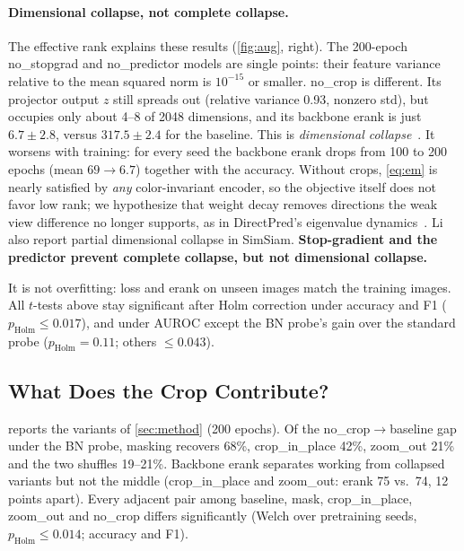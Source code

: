 \documentclass[10pt,twocolumn,letterpaper]{article}
\begin{document}
\paragraph{Dimensional collapse, not complete collapse.}
The effective rank explains these results (\cref{fig:aug}, right).
The 200-epoch no\_stopgrad and no\_predictor models are single points: their feature variance relative to the mean squared norm is $10^{-15}$ or smaller.
no\_crop is different. Its projector output $z$ still spreads out (relative variance 0.93, nonzero std), but occupies only about 4--8 of 2048 dimensions, and its backbone erank is just $6.7\pm2.8$, versus $317.5\pm2.4$ for the baseline.
This is \emph{dimensional collapse}~\cite{jing2022dimensional}.
It worsens with training: for every seed the backbone erank drops from 100 to 200 epochs (mean $69\rightarrow6.7$) together with the accuracy.
Without crops, \cref{eq:em} is nearly satisfied by \emph{any} color-invariant encoder, so the objective itself does not favor low rank; we hypothesize that weight decay removes directions the weak view difference no longer supports, as in DirectPred's eigenvalue dynamics~\cite{tian2021directpred}. Li \etal~\cite{li2022collapse} also report partial dimensional collapse in SimSiam.
\textbf{Stop-gradient and the predictor prevent complete collapse, but not dimensional collapse.}

It is not overfitting: loss and erank on unseen images match the training images.
All $t$-tests above stay significant after Holm correction under accuracy and F1 ($p_\text{Holm}\le0.017$), and under AUROC except the BN probe's gain over the standard probe ($p_\text{Holm}{=}0.11$; others $\le0.043$).

\subsection{What Does the Crop Contribute?}
\label{sec:exp_crop}


 reports the variants of \cref{sec:method} (200 epochs). Of the no\_crop$\to$baseline gap under the BN probe, masking recovers 68\%, crop\_in\_place 42\%, zoom\_out 21\% and the two shuffles 19--21\%. Backbone erank separates working from collapsed variants but not the middle (crop\_in\_place and zoom\_out: erank 75 vs.\ 74, 12 points apart).
Every adjacent pair among baseline, mask, crop\_in\_place, zoom\_out and no\_crop differs significantly (Welch over pretraining seeds, $p_\text{Holm}\le0.014$; accuracy and F1).
\end{document}
